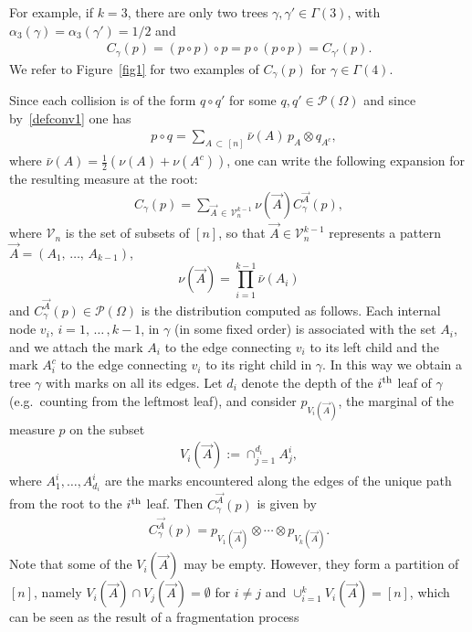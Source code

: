 \documentclass[10pt,a4paper]{article}
\newcommand{\cP}{\mathcal{P}}
\newcommand{\cV}{\mathcal{V}}
\let\a=\alpha
\let\g=\gamma
\let\G=\Gamma
\let\O=\Omega
\begin{document}
For example, if $k=3$, there are only two trees $\g,\g'\in\G(3)$, with $\a_3(\g)=\a_3(\g')=1/2$ and
\begin{align}\label{eq2}
C_{\gamma}(p)=(p \circ p)\circ p=p\circ(p \circ p)= C_{\gamma'}(p).
\end{align}
We refer to Figure~\ref{fig1} for two examples of $C_{\gamma}(p)$ for $\g\in\G(4)$.


Since each collision is of the form $q\circ q'$ for some $q,q'\in\cP(\O)$ and since by~\eqref{defconv1} one has
\begin{align}\label{lab:nons}
&p \circ q = \sum_{A\,\subset\,[n]}\bar\nu(A)\,p_A \otimes q_{A^c},
\end{align}
where $\bar\nu(A)= \frac12(\nu(A)+\nu(A^c))$, one can write the following expansion for the resulting measure at the root:
\begin{align}\label{eq5}
C_{\gamma}(p)= \sum_{\vec A\,\in\,\cV_n^{k-1}}\nu(\vec A) C^{\vec A}_{\gamma}(p),
\end{align}
where $\cV_n$ is the set of subsets of $[n]$, so that $\vec A\in \cV_n^{k-1}$ represents a pattern $\vec A=(A_1,\,\dots,\,A_{k-1})$,
\begin{equation}\label{eq:nua}
\nu(\vec A)= \prod_{i=1}^{k-1}\bar\nu(A_i)
\end{equation}
and $C^{\vec A}_{\gamma}(p)\in\cP(\O)$ is the distribution computed as follows. Each internal node $v_i$, $i=1,\,\dots\,,k-1$, in $\gamma$ (in some fixed order) is associated with the set $A_i$, and we attach the mark $A_i$ to the edge connecting $v_i$ to its left child and the mark $A_i^c$ to the edge connecting $v_i$ to its right child in $\gamma$. In this way we obtain a tree $\gamma$ with marks on all its edges. Let $d_i$ denote the depth of the $i^{\rm th}$ leaf of $\gamma$ (e.g.\ counting from the leftmost leaf), and consider $p_{V_i(\vec A)}$, the marginal of the measure $p$ on the subset
\begin{align}\label{eqa5}
V_i(\vec A):=\cap_{j=1}^{d_i} A^i_j,
\end{align}
where $A^i_1,\dots,A^i_{d_i}$ are the marks encountered along the edges of the unique path from the root to the $i^{\rm th}$ leaf. Then $ C^{\vec A}_{\gamma}(p)$ is given by
\begin{align}\label{eq6}
C^{\vec A}_{\gamma}(p) = p_{V_1(\vec A)}\otimes\cdots\otimes p_{V_k(\vec A)}.
\end{align}
Note that some of the $V_i(\vec A)$ may be empty. However, they form a partition of $[n]$, namely $V_i(\vec A)\cap V_j(\vec A)=\emptyset$ for $i\neq j$ and $\cup_{i=1}^kV_i(\vec A)=[n]$, which can be seen as the result of a fragmentation process
\end{document}
